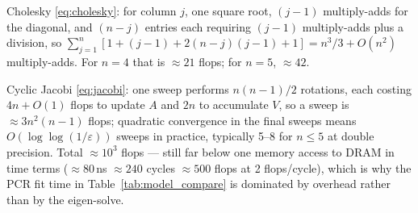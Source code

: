 Cholesky \eqref{eq:cholesky}: for column $j$, one square root, $(j-1)$ multiply-adds for
the diagonal, and $(n-j)$ entries each requiring $(j-1)$ multiply-adds plus a division, so
$\sum_{j=1}^n [1 + (j-1) + 2(n-j)(j-1) + 1] = n^3/3 + O(n^2)$ multiply-adds. For $n=4$
that is $\approx21$ flops; for $n=5$, $\approx42$.

Cyclic Jacobi \eqref{eq:jacobi}: one sweep performs $n(n-1)/2$ rotations, each costing
$4n+O(1)$ flops to update $A$ and $2n$ to accumulate $V$, so a sweep is
$\approx3n^2(n-1)$ flops; quadratic convergence in the final sweeps means $O(\log\log
(1/\varepsilon))$ sweeps in practice, typically 5--8 for $n\le5$ at double precision.
Total $\approx10^3$ flops --- still far below one memory access to DRAM in time terms
($\approx80$\,ns $\approx240$ cycles $\approx500$ flops at 2 flops/cycle), which is why the
PCR fit time in Table~\ref{tab:model_compare} is dominated by overhead rather than by the
eigen-solve.
